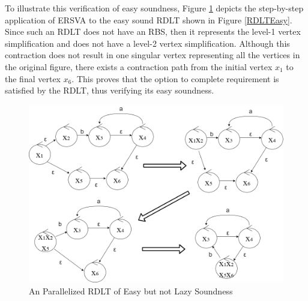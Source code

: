 To illustrate this verification of easy soundness, Figure \ref{VSEasy} depicts the step-by-step application of ERSVA to the easy sound RDLT shown in Figure \ref{RDLTEasy}. Since such an RDLT does not have an RBS, then it represents the level-1 vertex simplification and does not have a level-2 vertex simplification. Although this contraction does not result in one singular vertex representing all the vertices in the original figure, there exists a contraction path from the initial vertex $ x_1 $ to the final vertex $ x_6 $. This proves that the option to complete requirement is satisfied by the RDLT, thus verifying its easy soundness.

    \begin{figure}[H]
        \centering
        \includegraphics[width=15cm]{../figures/SV Easy Sound RDLT.png}
        \caption{An Parallelized RDLT of Easy but not Lazy Soundness}
        \label{VSEasy}
    \end{figure}


